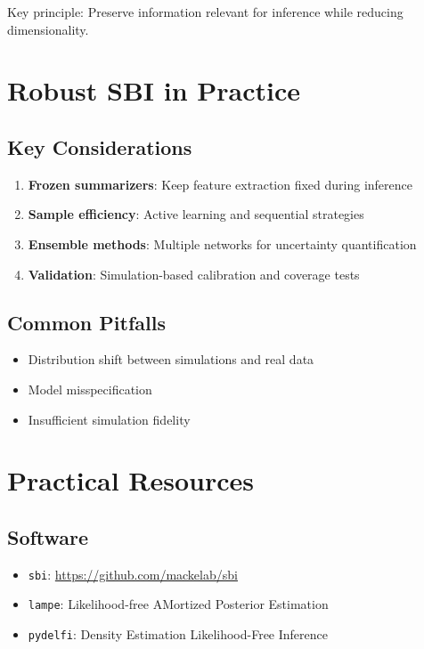 \documentclass{SciPost}
\begin{document}
Key principle: Preserve information relevant for inference while reducing dimensionality.

\section{Robust SBI in Practice}

\subsection{Key Considerations}
\begin{enumerate}
    \item \textbf{Frozen summarizers}: Keep feature extraction fixed during inference
    \item \textbf{Sample efficiency}: Active learning and sequential strategies
    \item \textbf{Ensemble methods}: Multiple networks for uncertainty quantification
    \item \textbf{Validation}: Simulation-based calibration and coverage tests
\end{enumerate}

\subsection{Common Pitfalls}
\begin{itemize}
    \item Distribution shift between simulations and real data
    \item Model misspecification
    \item Insufficient simulation fidelity
\end{itemize}

\section{Practical Resources}

\subsection{Software}
\begin{itemize}
    \item \texttt{sbi}: \url{https://github.com/mackelab/sbi}
    \item \texttt{lampe}: Likelihood-free AMortized Posterior Estimation
    \item \texttt{pydelfi}: Density Estimation Likelihood-Free Inference
\end{itemize}
\end{document}
